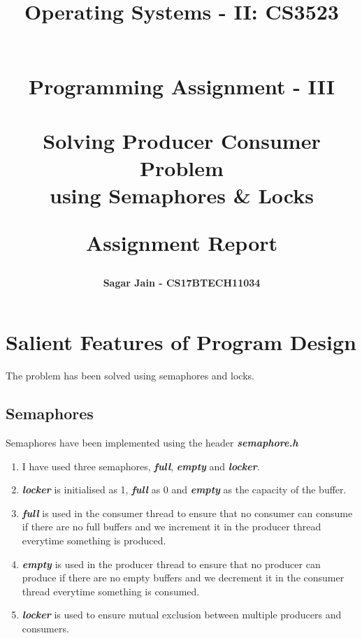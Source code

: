 \documentclass[a4paper,12pt]{report}
\begin{document}
\title{
\textbf{Operating Systems - II: CS3523}\\~\\
\begin{large}
\textbf{Programming Assignment - III\\~\\Solving Producer Consumer Problem\\using Semaphores
\& Locks\\}
\end{large}
\begin{large}
\textbf{Assignment Report}
\end{large}
}
\author{\textbf{Sagar Jain - CS17BTECH11034}\\}
\maketitle
\begin{large}
\tableofcontents
\end{large}
\newpage
\section{Salient Features of Program Design}
The problem has been solved using semaphores and locks.
\subsection{Semaphores}
Semaphores have been implemented using the header \textbf{\textit{semaphore.h}}
\begin{enumerate}
\item I have used three semaphores, \textbf{\textit{full}}, \textbf{\textit{empty}} and \textbf{\textit{locker}}.
\item \textbf{\textit{locker}} is initialised as 1, \textbf{\textit{full}} as 0 and \textbf{\textit{empty}} as the capacity of the buffer.
\item \textbf{\textit{full}} is used in the consumer thread to ensure that no consumer can consume if there are no full buffers and we increment it in the producer thread everytime something is produced.
\item \textbf{\textit{empty}} is used in the producer thread to ensure that no producer can produce if there are no empty buffers and we decrement it in the consumer thread everytime something is consumed.
\item \textbf{\textit{locker}} is used to ensure mutual exclusion between multiple producers and consumers.
\end{enumerate}
\end{document}
